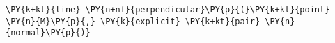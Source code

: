 \begin{Verbatim}[commandchars=\\\{\}]
    \PY{k+kt}{line} \PY{n+nf}{perpendicular}\PY{p}{(}\PY{k+kt}{point} \PY{n}{M}\PY{p}{,} \PY{k}{explicit} \PY{k+kt}{pair} \PY{n}{normal}\PY{p}{)}
\end{Verbatim}
